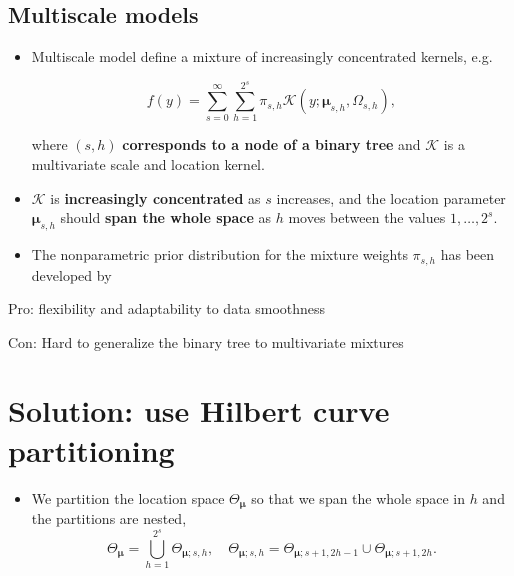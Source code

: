 \documentclass[a0,portrait]{a0poster}
\begin{document}
\begin{multicols}{2}
\subsection*{Multiscale models}
\color{Black}

\begin{itemize}
    \item[] Multiscale model define a mixture of increasingly concentrated kernels, e.g.

        \[
            f(y) = \sum_{s=0}^{\infty }\sum_{h=1}^{2^{s}} \pi_{s,h} \mathcal{K}(y; \bm{\mu}_{s,h}, \Omega_{s,h}),
        \]

        where $(s,h)$ \textbf{corresponds to a node of a binary tree} and $ \mathcal{K}$ is a multivariate scale and location kernel.
        
    \item[] $ \mathcal{K}$ is \textbf{increasingly concentrated} as $ s$ increases, and the location parameter $ \bm{\mu}_{s,h}$ should \textbf{span the whole space} as $ h$ moves between the values $ 1, \ldots, 2^{s}$.

    \item[] The nonparametric prior distribution for the mixture weights $ \pi_{s,h}$ has been developed by \citet{canale2016b}
        
\end{itemize}


\color{Black}
\begin{center}\vspace{1cm}
  
\end{center}\vspace{1cm}

\begin{flushright}
    \color{ForestGreen}
    \smiley{} Pro: flexibility and adaptability to data smoothness

\noindent
\color{red}
\frownie{} Con: Hard to generalize the binary tree to multivariate mixtures
\end{flushright}


\color{DarkRed}
\section*{Solution: use Hilbert curve partitioning}
\color{Black}
\begin{itemize}
    \item[] We partition the location space $ \Theta_{\bm{\mu}}$ so that we span the whole space in $ h$ and the partitions are nested,
        \[
            \Theta_{\bm{\mu}} = \bigcup_{h=1}^{2^{s}} \Theta_{\bm{\mu}; s,h}, \quad  \Theta_{\bm{\mu}; s,h} = \Theta_{\bm{\mu}; s+1, 2h-1} \cup \Theta_{\bm{\mu};s+1, 2h}.
        \]


\end{itemize}
\end{multicols}
\end{document}
